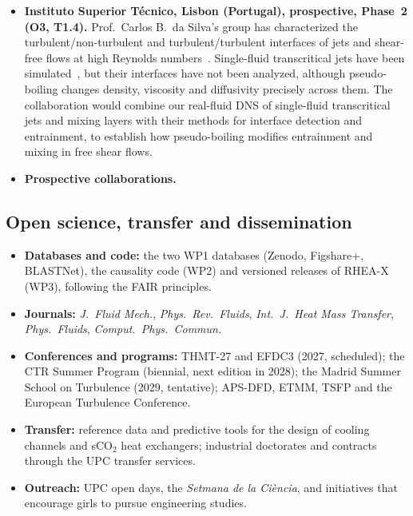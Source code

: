 \documentclass[11pt]{article}
\begin{document}
\begin{itemize}
  Caltech and MIT (Prof.\ A.\ Lozano-Dur\'an and \'A.\ Mart\'inez-S\'anchez: causality);
  Penn State (Prof.\ X.\ Yang: neural networks for wall-normal profiles); Stanford (group of
  Prof.\ M.\ Ihme: BLASTNet); ICM-CSIC Barcelona (microplastics and biofilms); BSC
  (hackathons).
  \item \textbf{Instituto Superior T\'ecnico, Lisbon (Portugal), prospective, Phase~2 (O3,
  T1.4).} Prof.\ Carlos B.\ da Silva's group has characterized the turbulent/non-turbulent and turbulent/turbulent
  interfaces of jets and shear-free flows at high Reynolds numbers~\cite{Silva2018,Alves2025}.
  Single-fluid transcritical jets have been simulated~\cite{Lapenna2019,Ream2025},
  but their interfaces have not been analyzed, although pseudo-boiling changes density,
  viscosity and diffusivity precisely across them. The collaboration would combine our
  real-fluid DNS of single-fluid transcritical jets and mixing layers with their methods for
  interface detection and entrainment, to establish how pseudo-boiling modifies entrainment
  and mixing in free shear flows.
  \item \textbf{Prospective collaborations.} 
\end{itemize}

\subsection{Open science, transfer and dissemination}\label{sec:dissemination}
\begin{itemize}
  \item \textbf{Databases and code:} the two WP1 databases (Zenodo, Figshare+, BLASTNet), the
  causality code (WP2) and versioned releases of RHEA-X (WP3), following the FAIR principles.
  \item \textbf{Journals:} \emph{J.\ Fluid Mech.}, \emph{Phys.\ Rev.\ Fluids}, \emph{Int.\ J.\
  Heat Mass Transfer}, \emph{Phys.\ Fluids}, \emph{Comput.\ Phys.\ Commun.}
  \item \textbf{Conferences and programs:} THMT-27 and EFDC3 (2027, scheduled); the CTR Summer
  Program (biennial, next edition in 2028); the Madrid Summer School on Turbulence (2029,
  tentative); APS-DFD, ETMM, TSFP and the European Turbulence Conference.
  \item \textbf{Transfer:} reference data and predictive tools for the design of cooling
  channels and sCO$_2$ heat exchangers; industrial doctorates and contracts through the UPC
  transfer services.
  \item \textbf{Outreach:} UPC open days, the \emph{Setmana de la Ci\`encia}, and initiatives
  that encourage girls to pursue engineering studies.
\end{itemize}
\end{document}
